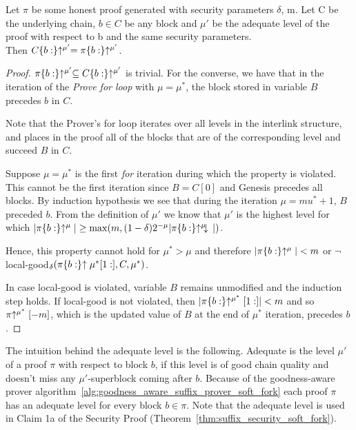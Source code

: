 \begin{lemma}
	Let $\pi$ be some honest proof generated with security
	parameters $\delta$, m. Let C be the underlying chain, $b \in C$ be any block
	and $\mu'$ be the adequate level of the proof with respect to b and the same
	security parameters.\\Then $C\{b:\}\negthickspace\uparrow^{\mu'} = \pi\{b:\}\negthickspace\uparrow^{\mu'}$.
	\label{lemm:complete_adequate}
\end{lemma}
\begin{proof}
	$ \pi\{b:\}\negthickspace\uparrow^{\mu'} \subseteq C\{b:\}\negthickspace\uparrow^{\mu'}$ is
	trivial. For the converse, we have that in the iteration of the \emph{Prove for
	loop}\cite{nipopows} with $\mu = \mu^*$, the block stored in variable $B$
	precedes $b$ in $C$.

	Note that the Prover's for loop iterates over all levels in the interlink structure,
	and places in the proof all of the blocks that are of the corresponding level and succeed $B$ in $C$.

	Suppose $\mu = \mu^*$ is the first \emph{for} iteration during which the property
	is violated. This cannot be the first iteration since $B = C[0]$ and Genesis
	precedes all blocks. By induction hypothesis we see that during the iteration
	$\mu = mu^* + 1$, $B$ preceded $b$. From the definition of $\mu'$ we know that
	$\mu'$ is the highest level for which $\vert \pi\{b:\}\negthickspace\uparrow^{\mu} \vert
	\geq \max( m, (1-\delta)2^{-\mu} \vert \pi\{b:\}\negthickspace\uparrow^{\mu}\negthickspace\downarrow\, \vert ) $.

	Hence, this property cannot hold for $\mu^* > \mu$ and therefore $\vert
	\pi\{b:\}\negthickspace\uparrow^{\mu} \vert < m$ or $\neg$local-good$_\delta(\pi\{b:
	\}\negthickspace\uparrow \mu^*[1:], C, \mu^*)$.

	In case local-good is violated, variable $B$ remains unmodified and the induction
	step holds. If local-good is not violated, then $ \vert \pi\{b:\} \negthickspace\uparrow^{\mu^*}[1:]
	\vert < m$ and so $\pi\negthickspace\uparrow^{\mu^*}[-m]$, which is the updated value of $B$ at the
	end of $\mu^*$ iteration, precedes $b$.
\end{proof}

The intuition behind the adequate level is the following. Adequate is the level $\mu'$ of a proof $\pi$ with respect to block $b$, if this level is of good chain quality and doesn't miss any $\mu'$-superblock coming after $b$. Because of the goodness-aware prover algorithm~\ref{alg:goodness_aware_suffix_prover_soft_fork} each proof $\pi$ has an adequate level for every block $b \in \pi$.
Note that the adequate level is used in Claim 1a of the Security Proof (Theorem~\ref{thm:suffix_security_soft_fork}).\\

